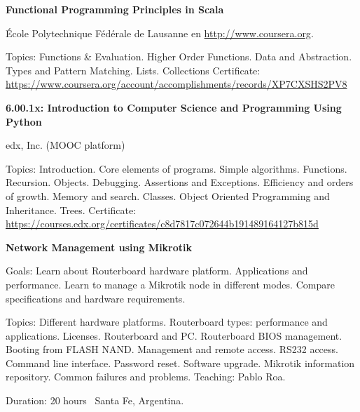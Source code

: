 \documentclass[letterpaper,MMMyyyy,nonstop]{simpleresumecv}
\begin{document}
\begin{body}
\BigGap
\textbf{Functional Programming Principles in Scala}
\hfill
{}

\BulletItem École Polytechnique Fédérale de Lausanne en \href{coursera.org}{http://www.coursera.org}.
\begin{detail}
	\SubBulletItem
	Topics: Functions \& Evaluation. Higher Order Functions. Data and Abstraction. Types and Pattern Matching. Lists. Collections
	\SubBulletItem
	Certificate: \href{https://www.coursera.org/account/accomplishments/records/XP7CXSHS2PV8}
	{https://www.coursera.org/account/accomplishments/records/XP7CXSHS2PV8}
	
\end{detail}


\BigGap
\textbf{6.00.1x: Introduction to Computer Science and Programming Using Python }
\hfill
{}

\BulletItem  edx, Inc. (MOOC platform)
\begin{detail}
	\SubBulletItem
	Topics: Introduction. Core elements of programs. Simple algorithms. Functions. Recursion. Objects. Debugging. Assertions and Exceptions. Efficiency and orders of growth. Memory and search. Classes. Object Oriented Programming	and Inheritance. Trees.
	\SubBulletItem
	Certificate: \href{https://courses.edx.org/certificates/c8d7817c072644b191489164127b815d}
	{https://courses.edx.org/certificates/c8d7817c072644b191489164127b815d}
	
\end{detail}


\BigGap
\textbf{Network Management using Mikrotik}
\hfill
{}

\BulletItem Goals: Learn about Routerboard hardware platform. Applications and performance. Learn to manage a Mikrotik node in different modes. Compare specifications and hardware requirements.
\begin{detail}
	\SubBulletItem 
	Topics: Different hardware platforms. Routerboard types: performance and applications. Licenses. Routerboard and PC. Routerboard BIOS management. Booting from FLASH NAND. Management and remote access. RS232 access. Command line interface. Password reset. Software upgrade. Mikrotik information repository. Common failures and problems.
	\SubBulletItem Teaching: Pablo Roa.
\end{detail}
Duration: 20 hours \SubBulletSymbol\, Santa Fe, Argentina.



\end{body}
\end{document}
